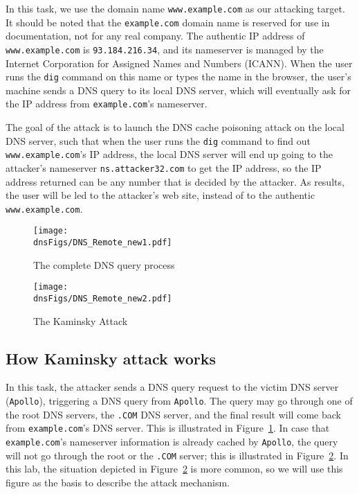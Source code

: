 In this task, we use the domain name {\tt www.example.com}
as our attacking target. It should be noted that the {\tt example.com} 
domain name is reserved for use in documentation, not for 
any real company. The authentic IP address of {\tt www.example.com} is 
{\tt 93.184.216.34}, and its nameserver is managed by
the Internet Corporation for Assigned Names and Numbers (ICANN).
When the user runs the {\tt dig} command 
on this name or types the name in the browser, 
the user's machine sends a DNS query to its local DNS 
server, which will eventually ask for the IP address 
from {\tt example.com}'s nameserver. 


The goal of the attack is to launch the DNS cache poisoning attack
on the local DNS server, such that 
when the user runs the {\tt dig} command to find out {\tt
www.example.com}'s IP address, the local DNS server will end
up going to the attacker's nameserver {\tt ns.attacker32.com} 
to get the IP address, so the IP address returned can be 
any number that is decided by the attacker. As results, the 
user will be led to the attacker's web site,
instead of to the authentic {\tt www.example.com}.




\begin{figure}[htb]
\centering
\texttt{[image: \\dnsFigs/DNS\_Remote\_new1.pdf]}
\caption{The complete DNS query process} 
\label{fig:flow_diagram1}
\end{figure}


\begin{figure}[htb]
\centering
\texttt{[image: \\dnsFigs/DNS\_Remote\_new2.pdf]}
\caption{The Kaminsky Attack}
\label{fig:flow_diagram2}
\end{figure}



\subsection{How Kaminsky attack works}

In this task, the attacker sends a DNS query request to the victim
DNS server ({\tt Apollo}), triggering a DNS query from {\tt Apollo}. The
query may go through one of the root DNS servers, the {\tt .COM} DNS server, and 
the final result will come back from {\tt example.com}'s DNS server. This 
is illustrated in Figure~\ref{fig:flow_diagram1}. In case that 
{\tt example.com}'s nameserver information is already cached by 
{\tt Apollo}, the query will not go through the root or the 
{\tt .COM} server; this is illustrated in Figure~\ref{fig:flow_diagram2}.
In this lab, the situation depicted in  Figure~\ref{fig:flow_diagram2} is 
more common, so we will use this figure as the basis to describe 
the attack mechanism.

